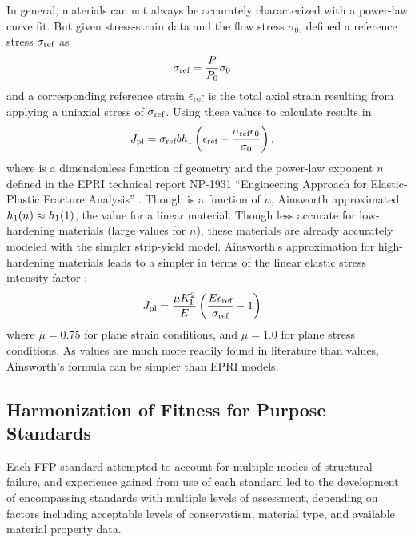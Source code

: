 In general, materials can not always be accurately characterized with a power-law curve fit.
But given stress-strain data and the flow stress \(\sigma_0\), \citet{ainsworth1984} defined a reference stress \(\sigma_\textnormal{ref}\) as
\begin{align}
\sigma_\textnormal{ref} &= \frac{P}{P_0}\sigma_0
\end{align}
and a corresponding reference strain \(\epsilon_\textnormal{ref}\) is the total axial strain resulting from applying a uniaxial stress of \(\sigma_\textnormal{ref}\).
Using these values to calculate \Jpl results in
\begin{align}
J_\textnormal{pl} &= \sigma_\textnormal{ref} b h_1 \left( \epsilon_\textnormal{ref} - \frac{\sigma_\textnormal{ref} \epsilon_0}{\sigma_0} \right),
\end{align}
where \hone is a dimensionless function of geometry and the power-law exponent \(n\) defined in the EPRI technical report NP-1931 ``Engineering Approach for Elastic-Plastic Fracture Analysis'' \citep{epri1981}.
Though \hone is a function of \(n\), Ainsworth approximated \(h_1(n) \approx h_1(1)\), the \hone value for a linear material.
Though less accurate for low-hardening materials (large values for \(n\)), these materials are already accurately modeled with the simpler strip-yield model.
Ainsworth's approximation for high-hardening materials leads to a simpler \Jpl in terms of the linear elastic stress intensity factor \KI:
\begin{align}
J_\textnormal{pl} &= \frac{\mu K_\textnormal{I}^2}{E} \left( \frac{E \epsilon_\textnormal{ref}}{\sigma_\textnormal{ref}} - 1 \right)
\label{eq:jpl-ainsworth}
\end{align}
where \(\mu = 0.75\) for plane strain conditions, and \(\mu = 1.0\) for plane stress conditions.
As \KI values are much more readily found in literature than \hone values, Ainsworth's \Jpl formula can be simpler than EPRI models.

\subsection{Harmonization of Fitness for Purpose Standards}

Each FFP standard attempted to account for multiple modes of structural failure, and experience gained from use of each standard led to the development of encompassing standards with multiple levels of assessment, depending on factors including acceptable levels of conservatism, material type, and available material property data.

